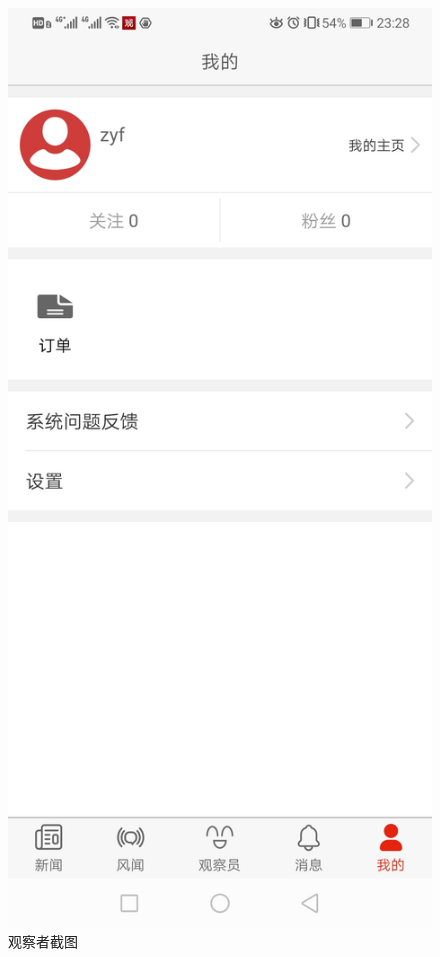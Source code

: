 \documentclass{article}
\begin{document}
\begin{figure}[h!]
	\centering
	\includegraphics[scale=0.2]{guan.jpg}
	\caption{观察者截图}
	\label{fig:ggwqc.jpg}
\end{figure}
\end{document}

